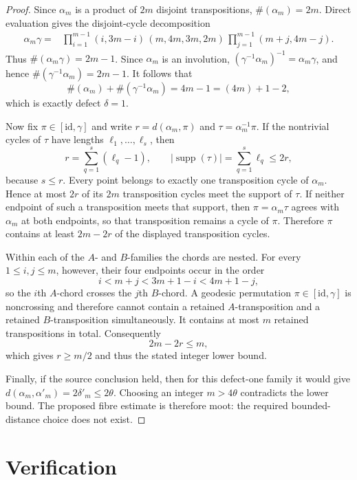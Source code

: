 \documentclass[11pt]{article}
\newcommand{\id}{\mathrm{id}}
\newcommand{\cyc}{\#}
\begin{document}
\begin{proof}
Since $\alpha_m$ is a product of $2m$ disjoint transpositions,
$\cyc(\alpha_m)=2m$.  Direct evaluation gives the disjoint-cycle
decomposition
\begin{align}\label{eq:complement}
\alpha_m\gamma={}&
\prod_{i=1}^{m-1}(i,3m-i)\,
(m,4m,3m,2m)\,
\prod_{j=1}^{m-1}(m+j,4m-j).
\end{align}
Thus $\cyc(\alpha_m\gamma)=2m-1$.  Since $\alpha_m$ is an involution,
$(\gamma^{-1}\alpha_m)^{-1}=\alpha_m\gamma$, and hence
$\cyc(\gamma^{-1}\alpha_m)=2m-1$.  It follows that
\[
\cyc(\alpha_m)+\cyc(\gamma^{-1}\alpha_m)
=4m-1=(4m)+1-2,
\]
which is exactly defect $\delta=1$.

Now fix $\pi\in[\id,\gamma]$ and write
$r=d(\alpha_m,\pi)$ and $\tau=\alpha_m^{-1}\pi$.  If the nontrivial cycles
of $\tau$ have lengths $\ell_1,\ldots,\ell_s$, then
\[
r=\sum_{q=1}^{s}(\ell_q-1),\qquad
|\operatorname{supp}(\tau)|=\sum_{q=1}^{s}\ell_q\leq2r,
\]
because $s\leq r$.  Every point belongs to exactly one transposition cycle of
$\alpha_m$.  Hence at most $2r$ of its $2m$ transposition cycles meet the
support of $\tau$.  If neither endpoint of such a transposition meets that
support, then $\pi=\alpha_m\tau$ agrees with $\alpha_m$ at both endpoints, so
that transposition remains a cycle of $\pi$.  Therefore $\pi$ contains at
least $2m-2r$ of the displayed transposition cycles.

Within each of the $A$- and $B$-families the chords are nested.  For every
$1\leq i,j\leq m$, however, their four endpoints occur in the order
\[
i<m+j<3m+1-i<4m+1-j,
\]
so the $i$th $A$-chord crosses the $j$th $B$-chord.  A geodesic permutation
$\pi\in[\id,\gamma]$ is noncrossing and therefore cannot contain a retained
$A$-transposition and a retained $B$-transposition simultaneously.  It
contains at most $m$ retained transpositions in total.  Consequently
\[
2m-2r\leq m,
\]
which gives $r\geq m/2$ and thus the stated integer lower bound.

Finally, if the source conclusion held, then for this defect-one family it
would give $d(\alpha_m,\alpha'_m)=2\delta'_m\leq2\theta$.  Choosing an integer
$m>4\theta$ contradicts the lower bound.  The proposed fibre estimate is
therefore moot: the required bounded-distance choice does not exist.
\end{proof}

\section{Verification}
\end{document}
